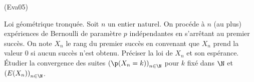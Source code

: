 \begin{tiny}(Eva05)\end{tiny} Loi géométrique tronquée.\newline
Soit $n$ un entier naturel. On procéde à $n$ (au plus) expériences de Bernoulli de paramètre $p$ indépendantes en s'arrêtant au premier succès. On note $X_n$ le rang du premier succès en convenant que $X_n$ prend la valeur $0$ si aucun succès n'est obtenu. Préciser la loi de $X_n$ et son espérance. \'Etudier la convergence des suites $\left( \p(X_n=k)\right) _{n\in \N}$ pour $k$ fixé dans $\N$ et $\left( E(X_n)\right) _{n\in \N}$.  